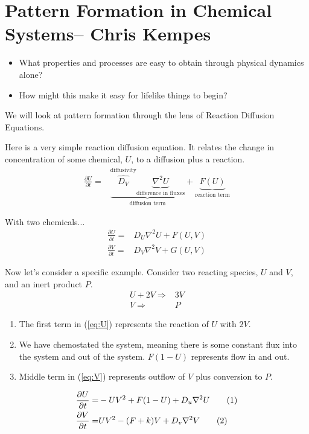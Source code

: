 \documentclass[]{article}
\newcommand\numberthis{\addtocounter{equation}{1}\tag{\theequation}}
\begin{document}
\section[Pattern Formation in Chemical Systems]{Pattern Formation in Chemical Systems-- Chris Kempes}

\begin{itemize}
	\item What properties and processes are easy to obtain through physical dynamics alone?	
	\item How might this make it easy for lifelike things to begin?
\end{itemize}

We will look at pattern formation through the lens of Reaction Diffusion Equations\cite{sfi_grayscott2018}.

Here is a very simple reaction diffusion equation. It relates the change in concentration of some chemical,  $U$, to a diffusion plus a reaction.
\begin{align*}
\frac{\partial U}{\partial t} =&   \underbrace{\overbrace{D_V}^\text{diffusivity} \underbrace{ \nabla^2 U }_\text{difference in fluxes}}_\text{diffusion term} + \underbrace{ F(U)}_\text{reaction term}
\end{align*}

With two chemicals...
\begin{align*}
\frac{\partial U}{\partial t} =&   D_U \nabla^2 U + F(U,V)\\
\frac{\partial V}{\partial t} =&   D_V \nabla^2 V + G(U,V)
\end{align*}

Now let's consider a specific example.
Consider two reacting species, $U$ and $V$, and an inert product $P$.
\begin{align*}
U + 2V \Longrightarrow& 3V\\
V \Longrightarrow& P
\end{align*}

\begin{enumerate}
	\item The first term in (\ref{eq:U}) represents the reaction of $U$ with $2V$. 
	\item We have chemostated the system, meaning there is some constant flux into the system and out of the system. $F(1 - U)$ represents flow in and out.
	\item Middle term in (\ref{eq:V}) represents outflow of $V$ plus conversion to $P$.
\end{enumerate}
\begin{align*}
	\frac{\partial U}{\partial t} =& -U V^2 + F(1 - U)  + D_u \nabla^2 U \numberthis \label{eq:U}\\
	\frac{\partial V}{\partial t} =& U V^2 - (F +k) V + D_v \nabla^2 V \numberthis \label{eq:V}
\end{align*}
\end{document}
